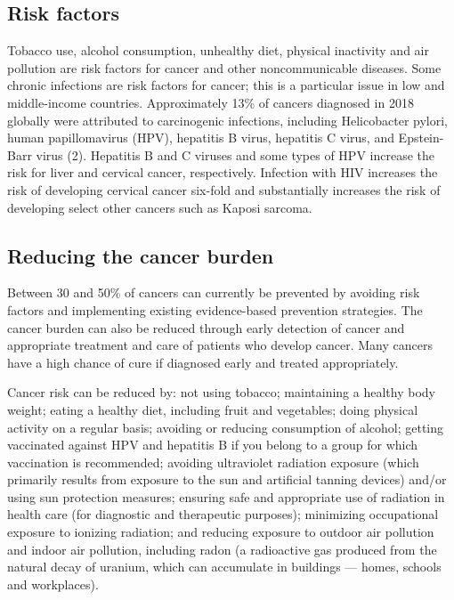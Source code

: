 \subsection{Risk factors}

Tobacco use, alcohol consumption, unhealthy diet, physical inactivity and air
pollution are risk factors for cancer and other noncommunicable diseases.  Some
chronic infections are risk factors for cancer; this is a particular issue in
low and middle-income countries. Approximately 13\% of cancers diagnosed in 2018
globally were attributed to carcinogenic infections, including Helicobacter
pylori, human papillomavirus (HPV), hepatitis B virus, hepatitis C virus, and
Epstein-Barr virus (2). Hepatitis B and C viruses and some types of HPV increase
the risk for liver and cervical cancer, respectively. Infection with HIV
increases the risk of developing cervical cancer six-fold and substantially
increases the risk of developing select other cancers such as Kaposi sarcoma.

\subsection{Reducing the cancer burden}

Between 30 and 50\% of cancers can currently be prevented by avoiding risk
factors and implementing existing evidence-based prevention strategies. The
cancer burden can also be reduced through early detection of cancer and
appropriate treatment and care of patients who develop cancer. Many cancers have
a high chance of cure if diagnosed early and treated appropriately.

Cancer risk can be reduced by: not using tobacco; maintaining a healthy body
weight; eating a healthy diet, including fruit and vegetables; doing physical
activity on a regular basis; avoiding or reducing consumption of alcohol;
getting vaccinated against HPV and hepatitis B if you belong to a group for
which vaccination is recommended; avoiding ultraviolet radiation exposure (which
primarily results from exposure to the sun and artificial tanning devices)
and/or using sun protection measures; ensuring safe and appropriate use of
radiation in health care (for diagnostic and therapeutic purposes); minimizing
occupational exposure to ionizing radiation; and reducing exposure to outdoor
air pollution and indoor air pollution, including radon (a radioactive gas
produced from the natural decay of uranium, which can accumulate in buildings —
homes, schools and workplaces).

